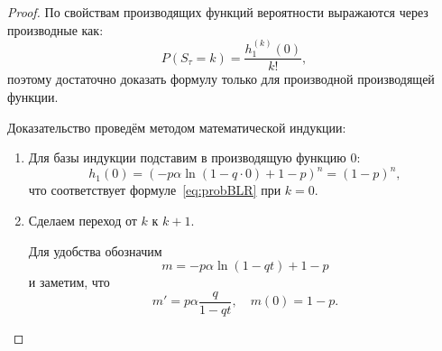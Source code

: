 \documentclass[12pt, specialist, subf, substylefile = spbu_report.rtx]{disser}
\begin{document}
	\begin{proof}
		По свойствам производящих функций вероятности выражаются через производные как:
		\[
			P(S _\tau = k) = \frac{h _1 ^{(k)}(0)} {k!},
		\]
		поэтому достаточно доказать формулу только для производной производящей функции.
		
		Доказательство проведём методом математической индукции:
		
		\begin{enumerate}
			\item Для базы индукции подставим в производящую функцию $0$:
			\[
				h _1(0) = \left(-p \alpha \ln (1 - q \cdot 0) + 1 - p\right) ^n = (1 - p) ^n,
			\]
			что соответствует формуле~\ref{eq:probBLR} при $k = 0$.
			
			\item Сделаем переход от $k$ к $k + 1$.
			
			Для удобства обозначим
			\[
				m = -p\alpha \ln(1 - qt) + 1 - p
			\]
			и заметим, что
			\[
				m ' = p \alpha \frac{q}{1 - q t}, \quad m(0) = 1 - p.
			\]
			

\end{enumerate}
\end{proof}
\end{document}
